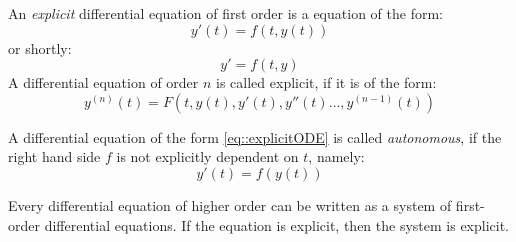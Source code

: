 \begin{definition}
	An \textit{explicit} differential equation of first order is	a equation of the form:
	\begin{equation}
		y'(t)=f\left(t,y(t)\right)
		\label{eq::explicitODE}
	\end{equation}
	or shortly:
	\begin{equation}
		y'=f\left(t,y\right)
	\end{equation}
	A differential equation of order $n$ is called explicit, if it is of the form:
	\begin{equation}
		y^{(n)}(t) = F\left(t,y(t),y'(t),y''(t)\dots,y^{(n-1)}(t)\right)
	\end{equation}
\end{definition}

\begin{definition}
	A differential equation of the form \eqref{eq::explicitODE} is called	\textit{autonomous}, if the right hand side $f$ is not explicitly dependent on $t$, namely:
	\begin{equation}
		y'(t)=f\left(y(t)\right)
	\end{equation}
\end{definition}

\begin{lemma}
	Every differential equation of higher order can be written as a system of first-order differential equations. If the equation is explicit, then the system is explicit.
\end{lemma}

